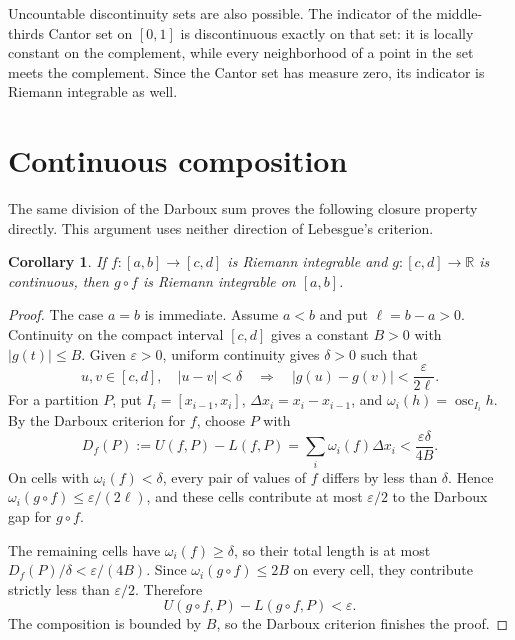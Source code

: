 \documentclass[11pt]{article}
\newtheorem{corollary}[theorem]{Corollary}
\newcommand{\R}{\mathbb R}
\DeclareMathOperator{\osc}{osc}
\begin{document}
Uncountable discontinuity sets are also possible. The indicator of the middle-thirds Cantor set on $[0,1]$ is discontinuous exactly on that set: it is locally constant on the complement, while every neighborhood of a point in the set meets the complement. Since the Cantor set has measure zero, its indicator is Riemann integrable as well.

\clearpage
\section{Continuous composition}
The same division of the Darboux sum proves the following closure property directly. This argument uses neither direction of Lebesgue's criterion.
\begin{corollary}
If $f:[a,b]\to[c,d]$ is Riemann integrable and $g:[c,d]\to\R$ is continuous, then $g\circ f$ is Riemann integrable on $[a,b]$.
\end{corollary}
\begin{proof}
The case $a=b$ is immediate. Assume $a<b$ and put $\ell=b-a>0$. Continuity on the compact interval $[c,d]$ gives a constant $B>0$ with $|g(t)|\leq B$. Given $\varepsilon>0$, uniform continuity gives $\delta>0$ such that
\[
 u,v\in[c,d],\quad |u-v|<\delta
 \quad\Longrightarrow\quad |g(u)-g(v)|<\frac{\varepsilon}{2\ell}.
\]
For a partition $P$, put $I_i=[x_{i-1},x_i]$, $\Delta x_i=x_i-x_{i-1}$, and $\omega_i(h)=\osc_{I_i}h$. By the Darboux criterion for $f$, choose $P$ with
\[
 D_f(P):=U(f,P)-L(f,P)=\sum_i\omega_i(f)\Delta x_i
 <\frac{\varepsilon\delta}{4B}.
\]
On cells with $\omega_i(f)<\delta$, every pair of values of $f$ differs by less than $\delta$. Hence $\omega_i(g\circ f)\leq\varepsilon/(2\ell)$, and these cells contribute at most $\varepsilon/2$ to the Darboux gap for $g\circ f$.

The remaining cells have $\omega_i(f)\geq\delta$, so their total length is at most $D_f(P)/\delta<\varepsilon/(4B)$. Since $\omega_i(g\circ f)\leq2B$ on every cell, they contribute strictly less than $\varepsilon/2$. Therefore
\[
 U(g\circ f,P)-L(g\circ f,P)<\varepsilon.
\]
The composition is bounded by $B$, so the Darboux criterion finishes the proof.
\end{proof}
\end{document}
